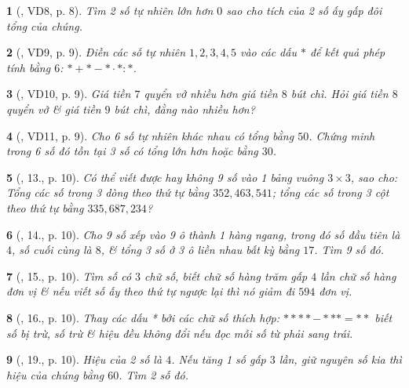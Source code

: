 \documentclass{article}
\newtheorem{baitoan}{}
\begin{document}
\begin{baitoan}[\cite{Binh_Toan_6_tap_1}, VD8, p. 8]
	Tìm 2 số tự nhiên lớn hơn $0$ sao cho tích của 2 số ấy gấp đôi tổng của chúng.
\end{baitoan}

\begin{baitoan}[\cite{Binh_Toan_6_tap_1}, VD9, p. 9]
	Điền các số tự nhiên $1,2,3,4,5$ vào các dấu $*$ để kết quả phép tính bằng $6$:  $*+*-*\cdot*:*$.
\end{baitoan}

\begin{baitoan}[\cite{Binh_Toan_6_tap_1}, VD10, p. 9]
	Giá tiền $7$ quyển vở nhiều hơn giá tiền $8$ bút chì. Hỏi giá tiền $8$ quyển vở \& giá tiền $9$ bút chì, đằng nào nhiều hơn?
\end{baitoan}

\begin{baitoan}[\cite{Binh_Toan_6_tap_1}, VD11, p. 9]
	Cho 6 số tự nhiên khác nhau có tổng bằng $50$. Chứng minh trong 6 số đó tồn tại 3 số có tổng lớn hơn hoặc bằng $30$.	
\end{baitoan}

\begin{baitoan}[\cite{Binh_Toan_6_tap_1}, 13., p. 10]
	Có thể viết được hay không 9 số vào 1 bảng vuông $3\times 3$, sao cho: Tổng các số trong 3 dòng theo thứ tự bằng $352, 463, 541$; tổng các số trong 3 cột theo thứ tự bằng $335, 687, 234$?
\end{baitoan}

\begin{baitoan}[\cite{Binh_Toan_6_tap_1}, 14., p. 10]
	Cho 9 số xếp vào 9 ô thành 1 hàng ngang, trong đó số đầu tiên là $4$, số cuối cùng là $8$, \& tổng 3 số ở 3 ô liền nhau bất kỳ bằng $17$. Tìm 9 số đó.
\end{baitoan}

\begin{baitoan}[\cite{Binh_Toan_6_tap_1}, 15., p. 10]
	Tìm số có $3$ chữ số, biết chữ số hàng trăm gấp $4$ lần chữ số hàng đơn vị \& nếu viết số ấy theo thứ tự ngược lại thì nó giảm đi $594$ đơn vị.
\end{baitoan}

\begin{baitoan}[\cite{Binh_Toan_6_tap_1}, 16., p. 10]
	Thay các dấu * bởi các chữ số thích hợp: $**** - *** = **$ biết số bị trừ, số trừ \& hiệu đều không đổi nếu đọc mỗi số từ phải sang trái.
\end{baitoan}

\begin{baitoan}[\cite{Binh_Toan_6_tap_1}, 19., p. 10]
	Hiệu của 2 số là $4$. Nếu tăng 1 số gấp $3$ lần, giữ nguyên số kia thì hiệu của chúng bằng $60$. Tìm 2 số đó.
\end{baitoan}
\end{document}
